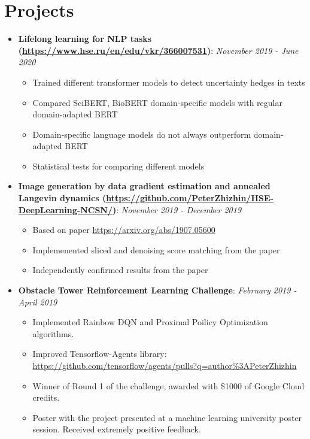 \documentclass[letterpaper,9pt]{extarticle}
\newcommand{\resumeItem}[2]{
  \item\small{
    \textbf{#1}{: #2 \vspace{-2pt}}
  }
}
\newcommand{\resumeSubItem}[2]{\resumeItem{#1}{#2}\vspace{-4pt}}
\newcommand{\resumeSubHeadingListStart}{\begin{itemize}[leftmargin=*]}
\newcommand{\resumeSubHeadingListEnd}{\end{itemize}}
\newcommand{\resumeItemListStart}{\begin{itemize}}
\newcommand{\resumeItemListEnd}{\end{itemize}\vspace{-5pt}}
\begin{document}
\section{Projects}
  \resumeSubHeadingListStart
  \resumeSubItem{Lifelong learning for NLP tasks (\url{https://www.hse.ru/en/edu/vkr/366007531})}{\hfill \em{November 2019 - June 2020}} 
    \resumeItemListStart
    \item Trained different transformer models to detect uncertainty hedges in texts
    \item Compared SciBERT, BioBERT domain-specific models with regular domain-adapted BERT
    \item Domain-specific language models do not always outperform domain-adapted BERT
    \item Statistical tests for comparing different models
    \resumeItemListEnd
  \resumeSubHeadingListEnd
  \resumeSubHeadingListStart
  \resumeSubItem{Image generation by data gradient estimation and annealed Langevin dynamics (\url{https://github.com/PeterZhizhin/HSE-DeepLearning-NCSN/})}
  {\hfill \em{November 2019 - December 2019}} 
    \resumeItemListStart
    \item Based on paper \url{https://arxiv.org/abs/1907.05600}
    \item Implemenented sliced and denoising score matching from the paper
    \item Independently confirmed results from the paper
    \resumeItemListEnd
  \resumeSubHeadingListEnd
  \resumeSubHeadingListStart
  \resumeSubItem{Obstacle Tower Reinforcement Learning Challenge}
  {\hfill \em{February 2019 - April 2019}}
    \resumeItemListStart
    \item Implemented Rainbow DQN and Proximal Poilicy Optimization algorithms.
    \item Improved Tensorflow-Agents library: \href{https://github.com/tensorflow/agents/pulls?q=author\%3APeterZhizhin}{https://github.com/tensorflow/agents/pulls?q=author\%3APeterZhizhin}
    \item Winner of Round 1 of the challenge, awarded with \$1000 of Google Cloud credits.
    \item Poster with the project presented at a machine learning university poster session. Received extremely positive feedback.
    \resumeItemListEnd
  \resumeSubHeadingListEnd
\end{document}
